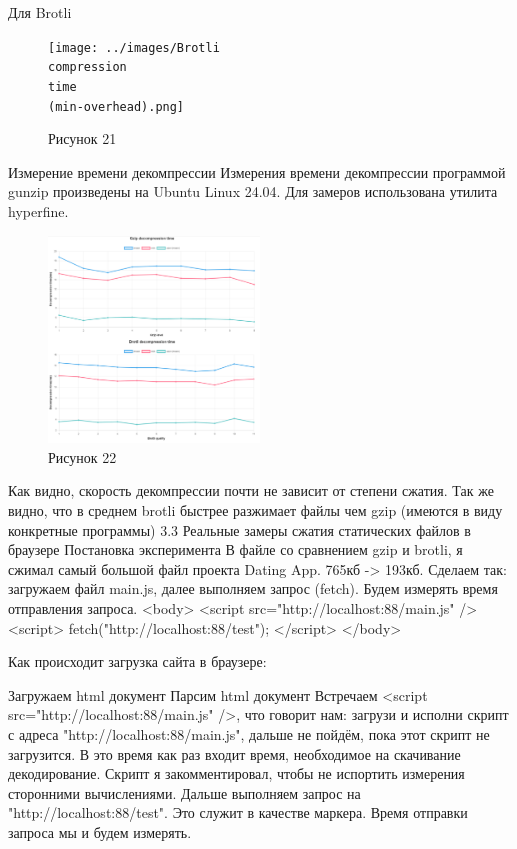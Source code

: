 \documentclass[12pt]{article}
\begin{document}
    Для Brotli
    \begin{figure}[h!]
        \centering
        \texttt{[image: ../images/Brotli\\ compression\\ time\\ (min-overhead).png]}
        \caption{Рисунок 21}
    \end{figure}

    Измерение времени декомпрессии
    Измерения времени декомпрессии программой gunzip произведены на Ubuntu Linux 24.04. Для замеров использована утилита hyperfine.
    \begin{figure}[h!]
        \centering
        \includegraphics[width=0.5\textwidth]{../images/Decompression_time.png}
        \caption{Рисунок 22}
    \end{figure}

    Как видно, скорость декомпрессии почти не зависит от степени сжатия.
    Так же видно, что в среднем brotli быстрее разжимает файлы чем gzip (имеются в виду конкретные программы)
    3.3 Реальные замеры сжатия статических файлов в браузере
    Постановка эксперимента
    В файле со сравнением gzip и brotli, я сжимал самый большой файл проекта Dating App. 765кб -> 193кб.
    Сделаем так:
    загружаем файл main.js, далее выполняем запрос (fetch). Будем измерять время отправления запроса.
    <body>
    <script src="http://localhost:88/main.js" />
    <script>
    fetch("http://localhost:88/test");
    </script>
    </body>

    Как происходит загрузка сайта в браузере:

    Загружаем html документ
    Парсим html документ
    Встречаем <script src="http://localhost:88/main.js" />, что говорит нам: загрузи и исполни скрипт с адреса "http://localhost:88/main.js",
    дальше не пойдём, пока этот скрипт не загрузится. В это время как раз входит время, необходимое на скачивание декодирование.
    Скрипт я закомментировал, чтобы не испортить измерения сторонними вычислениями.
    Дальше выполняем запрос на "http://localhost:88/test". Это служит в качестве маркера. Время отправки запроса мы и будем измерять.
\end{document}
